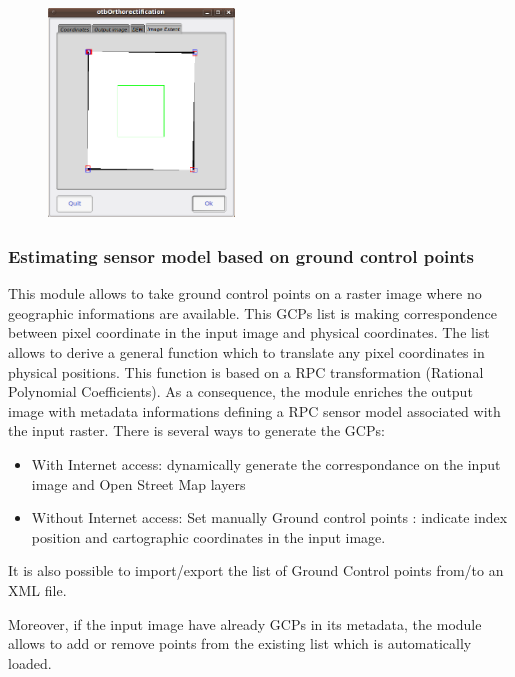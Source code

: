 \begin{figure}
  \center
  \includegraphics[width=0.44\textwidth]{../Art/MonteverdiImages/monteverdi_ortho_extent.png}
  \label{fig:ortho}
\end{figure}


\subsubsection{Estimating sensor model based on ground control points}
This module allows to take ground control points on a raster image
where no geographic informations are available.  This GCPs list is
making correspondence between pixel coordinate in the input image and
physical coordinates. The list allows to derive a general function
which to translate any pixel coordinates in physical positions. This
function is based on a RPC transformation (Rational Polynomial
Coefficients). As a consequence, the module enriches the output image
with metadata informations defining a RPC sensor model associated with
the input raster.  There is several ways to generate the GCPs:

\begin{itemize}
\item With Internet access: dynamically generate the correspondance on
  the input image and Open Street Map layers
\item Without Internet access: Set manually Ground control points :
  indicate index position and cartographic coordinates in the input
  image.
\end{itemize}

It is also possible to import/export the list of Ground Control points
from/to an XML file.

Moreover, if the input image have already GCPs in its metadata, the
module allows to add or remove points from the existing list which is
automatically loaded.

